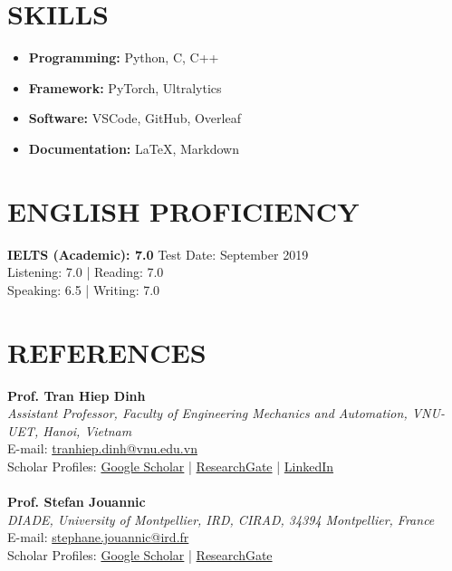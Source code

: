 \documentclass[a4paper,9pt]{extarticle}
\begin{document}
\section*{SKILLS}
\begin{itemize}
    \item \textbf{Programming:} Python, C, C++
    \item \textbf{Framework:} PyTorch, Ultralytics
    \item \textbf{Software:} VSCode, GitHub, Overleaf
    \item \textbf{Documentation:} LaTeX, Markdown
\end{itemize}

\section*{ENGLISH PROFICIENCY}
\noindent\textbf{IELTS (Academic): 7.0} \hfill Test Date: September 2019\\ 
Listening: 7.0 | Reading: 7.0 \\
Speaking: 6.5 | Writing: 7.0 

\section*{REFERENCES}
\label{sec:references}
\textbf{Prof. Tran Hiep Dinh}\\
\textit{Assistant Professor, Faculty of Engineering Mechanics and Automation, VNU-UET, Hanoi, Vietnam}\\
E-mail: \href{mailto:tranhiep.dinh@vnu.edu.vn}{tranhiep.dinh@vnu.edu.vn}\\
Scholar Profiles: \href{https://scholar.google.com/citations?user=fJYX_zsAAAAJ&hl=en&oi=ao}{Google Scholar} | \href{https://www.researchgate.net/profile/Tran-Hiep-Dinh}{ResearchGate} | \href{https://www.linkedin.com/in/tran-hiep-dinh/}{LinkedIn}\\ \\
\textbf{Prof. Stefan Jouannic}\\
\textit{DIADE, University of Montpellier, IRD, CIRAD, 34394 Montpellier, France}\\
E-mail: \href{mailto:stephane.jouannic@ird.fr}{stephane.jouannic@ird.fr}\\
Scholar Profiles: \href{https://scholar.google.com/citations?user=y5kP-ZAAAAAJ&hl=vi}{Google Scholar} | \href{https://www.researchgate.net/profile/Stefan-Jouannic}{ResearchGate}\\ \\

\end{document}
